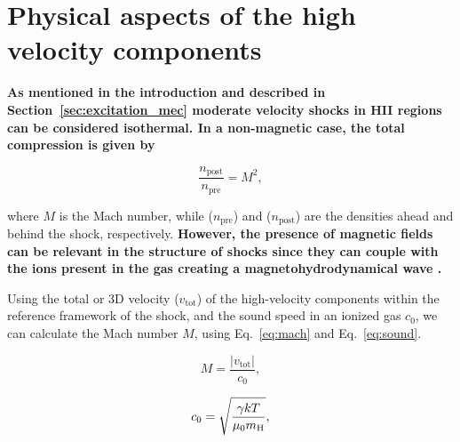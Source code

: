 \documentclass[fleqn,usenatbib]{mnras}
\begin{document}
\section{Physical aspects of the high velocity components}
\label{subsec:dym_impl}

{\bf As mentioned in the introduction and described in Section~\ref{sec:excitation_mec} moderate velocity shocks in H\thinspace II regions can be considered isothermal. In a non-magnetic case, the total compression is given by }

\begin{equation}
\label{eq:den_ratio_mach}
    \frac{n_{\text{post}}}{n_{\text{pre}}}=M^2,
\end{equation}

\noindent where $M$ is the Mach number, while ($n_{\text{pre}}$) and ($n_{\text{post}}$) are the densities ahead and behind the shock, respectively. {\bf However, the presence of magnetic fields can be relevant in the structure of shocks since they can couple with the ions present in the gas creating a magnetohydrodynamical wave \citep{osterbrock06}.  }

Using the total or 3D velocity ($v_{\text{tot}}$) of the high-velocity components within the reference framework of the shock, and the sound speed in an ionized gas $c_0$, we can calculate the Mach number $M$, using Eq.~\eqref{eq:mach} and Eq.~\eqref{eq:sound}.

\begin{equation}
\label{eq:mach}
    M=\frac{|v_{\text{tot}}|}{c_0},
\end{equation}

\begin{equation}
\label{eq:sound}
    c_0=\sqrt{\frac{\gamma k T}{\mu_0 m_{\text H}}},
\end{equation}
\end{document}
